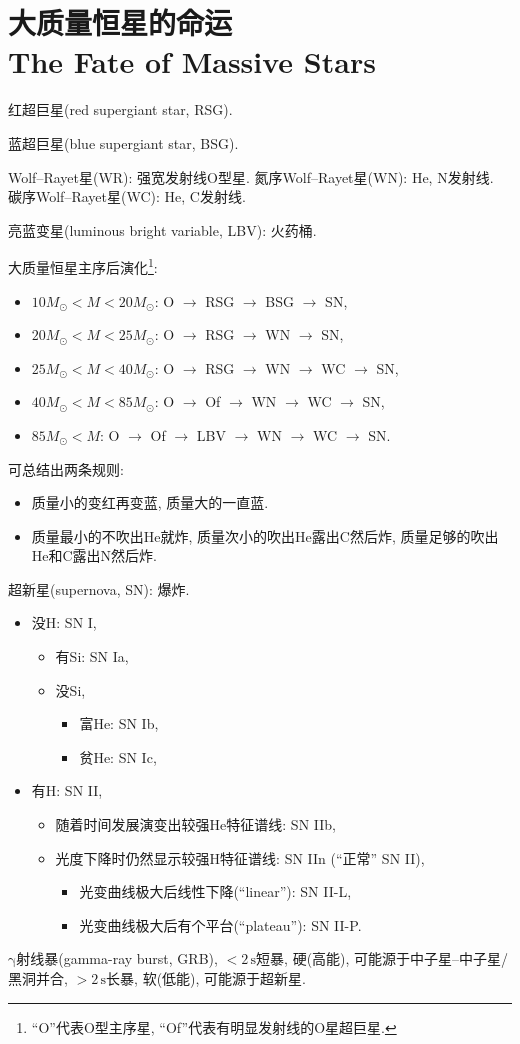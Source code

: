 \chapter{大质量恒星的命运\\The Fate of Massive Stars}

红超巨星(red supergiant star, RSG).

蓝超巨星(blue supergiant star, BSG).

Wolf--Rayet星(WR): 强宽发射线O型星. 氮序Wolf--Rayet星(WN): He, N发射线. 碳序Wolf--Rayet星(WC): He, C发射线.

亮蓝变星(luminous bright variable, LBV): 火药桶.

大质量恒星主序后演化\footnote{``O''代表O型主序星, ``Of''代表有明显发射线的O星超巨星.}:
\begin{itemize}
    \item $10M_\odot<M<20M_\odot$: O $\to$ RSG $\to$ BSG $\to$ SN,
    \item $20M_\odot<M<25M_\odot$: O $\to$ RSG $\to$ WN $\to$ SN,
    \item $25M_\odot<M<40M_\odot$: O $\to$ RSG $\to$ WN $\to$ WC $\to$ SN,
    \item $40M_\odot<M<85M_\odot$: O $\to$ Of $\to$ WN $\to$ WC $\to$ SN,
    \item $85M_\odot<M$: O $\to$ Of $\to$ LBV $\to$ WN $\to$ WC $\to$ SN.
\end{itemize}
可总结出两条规则:
\begin{itemize}
    \item 质量小的变红再变蓝, 质量大的一直蓝.
    \item 质量最小的不吹出He就炸, 质量次小的吹出He露出C然后炸, 质量足够的吹出He和C露出N然后炸.
\end{itemize}

超新星(supernova, SN): 爆炸.
\begin{itemize}
    \item 没H: SN I,
    \begin{itemize}
        \item 有Si: SN Ia,
        \item 没Si,
        \begin{itemize}
            \item 富He: SN Ib,
            \item 贫He: SN Ic,
        \end{itemize}
    \end{itemize}
    \item 有H: SN II,
    \begin{itemize}
        \item 随着时间发展演变出较强He特征谱线: SN IIb,
        \item 光度下降时仍然显示较强H特征谱线: SN IIn (``正常'' SN II),
        \begin{itemize}
            \item 光变曲线极大后线性下降(``linear''): SN II-L,
            \item 光变曲线极大后有个平台(``plateau''): SN II-P.
        \end{itemize}
    \end{itemize}
\end{itemize}

$\mathrm{\gamma}$射线暴(gamma-ray burst, GRB), $<2\,\text{s}$短暴, 硬(高能), 可能源于中子星--中子星/黑洞并合, $>2\,\text{s}$长暴, 软(低能), 可能源于超新星.
